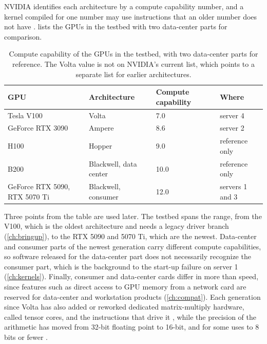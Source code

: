 NVIDIA identifies each architecture by a compute capability number, and a
kernel compiled for one number may use instructions that an older number does
not have \citep{cuda_gpus}.  lists the GPUs in the testbed with
two data-center parts for comparison.

\begin{table}[htbp]
  \centering
  \caption[Compute capability of the GPUs in the testbed]{Compute capability of the GPUs in the testbed, with two data-center parts for reference. The Volta value is not on NVIDIA's current list, which points to a separate list for earlier architectures.}
  \label{tab:cc}
  \small
  \begin{tabular}{L{4.4cm}L{3.2cm}L{2.6cm}L{3.2cm}}
    \toprule
    GPU & Architecture & Compute capability & Where \\
    \midrule
    Tesla V100 & Volta & 7.0 & server 4 \\
    GeForce RTX 3090 & Ampere & 8.6 & server 2 \\
    H100 & Hopper & 9.0 & reference only \\
    B200 & Blackwell, data center & 10.0 & reference only \\
    GeForce RTX 5090, RTX 5070 Ti & Blackwell, consumer & 12.0 & servers 1 and 3 \\
    \bottomrule
  \end{tabular}
\end{table}

Three points from the table are used later. The testbed spans the range,
from the V100, which is the oldest architecture and needs a legacy driver
branch (\cref{ch:bringup}), to the RTX 5090 and 5070 Ti, which are the
newest. Data-center and consumer parts of the newest generation carry
different compute capabilities, so software released for the data-center
part does not necessarily recognize the consumer part, which is the
background to the start-up failure on server 1 (\cref{ch:kernels}). Finally,
consumer and data-center cards differ in more than speed, since features
such as direct access to GPU memory from a network card are reserved for
data-center and workstation products (\cref{ch:compat}). Each generation
since Volta has also added or reworked dedicated matrix-multiply hardware,
called tensor cores, and the instructions that drive it
\citep{patel2025tensorcore}, while the precision of the arithmetic has moved
from 32-bit floating point to 16-bit, and for some uses to 8 bits or fewer
\citep{micikevicius2018,rouhani2023mx}.


